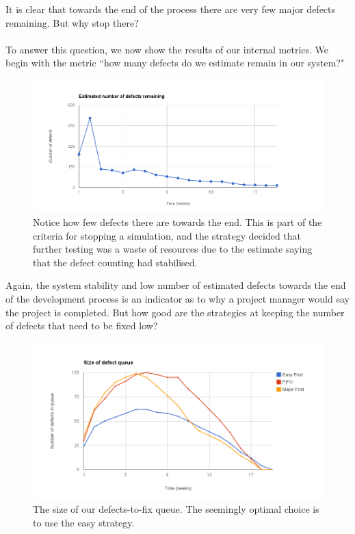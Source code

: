 It is clear that towards the end of the process there are very few major defects remaining.
But why stop there?\\
\\
To answer this question, we now show the results of our internal metrics.
We begin with the metric ``how many defects do we estimate remain in our system?"

\pagebreak

\begin{figure}[ht!]
	\centering
	\includegraphics[scale=0.45]{graphs/EstRemDefs.png}
	\caption{Notice how few defects there are towards the end. This is part of the criteria for
stopping a simulation, and the strategy decided that further testing was a waste of resources due to
the estimate saying that the defect counting had stabilised.} 
	\label{estremdefs}
\end{figure}

Again, the system stability and low number of estimated defects towards the end of the development
process is an indicator as to why a project manager would say the project is completed.
But how good are the strategies at keeping the number of defects that need to be fixed low?

\pagebreak

\begin{figure}[ht!]
	\centering
	\includegraphics[scale=0.45]{graphs/QueueSz.png}
	\caption{The size of our defects-to-fix queue. The seemingly optimal choice is to use the easy
strategy.} 
	\label{qsz}
\end{figure}

